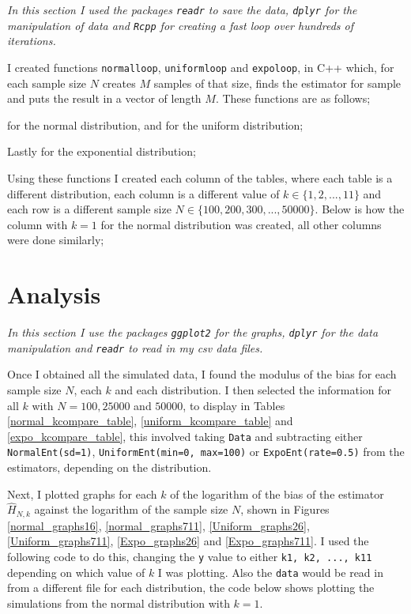 \documentclass[12pt]{report}
\begin{document}
\begin{appendix}
\textit{In this section I used the packages \texttt{readr} to save the data, \texttt{dplyr} for the manipulation of data and \texttt{Rcpp} for creating a fast loop over hundreds of iterations.} 

I created functions \texttt{normalloop}, \texttt{uniformloop} and \texttt{expoloop}, in C++ which, for each sample size $N$ creates $M$ samples of that size, finds the estimator for sample and puts the result in a vector of length $M$. These functions are as follows;



for the normal distribution, and for the uniform distribution;



Lastly for the exponential distribution;



Using these functions I created each column of the tables, where each table is a different distribution, each column is a different value of $k \in \{1, 2, ..., 11\}$ and each row is a different sample size $N \in \{100, 200, 300, ..., 50000\}$. Below is how the column with $k=1$ for the normal distribution was created, all other columns were done similarly;





\section{Analysis}

\textit{In this section I use the packages \texttt{ggplot2} for the graphs, \texttt{dplyr} for the data manipulation and \texttt{readr} to read in my csv data files.}

Once I obtained all the simulated data, I found the modulus of the bias for each sample size $N$, each $k$ and each distribution. I then selected the information for all $k$ with $N=100, 25000$ and $50000$, to display in Tables \ref{normal_kcompare_table}, \ref{uniform_kcompare_table} and \ref{expo_kcompare_table}, this involved taking \texttt{Data} and subtracting either \texttt{NormalEnt(sd=1)}, \texttt{UniformEnt(min=0, max=100)} or \texttt{ExpoEnt(rate=0.5)} from the estimators, depending on the distribution.

Next, I plotted graphs for each $k$ of the logarithm of the bias of the estimator $\hat{H}_{N, k}$ against the logarithm of the sample size $N$, shown in Figures \ref{normal_graphs16}, \ref{normal_graphs711}, \ref{Uniform_graphs26}, \ref{Uniform_graphs711}, \ref{Expo_graphs26} and \ref{Expo_graphs711}. I used the following code to do this, changing the \texttt{y} value to either \texttt{k1, k2, ..., k11} depending on which value of $k$ I was plotting. Also the \texttt{data} would be read in from a different file for each distribution, the code below shows plotting the simulations from the normal distribution with $k=1$.


\end{appendix}
\end{document}
